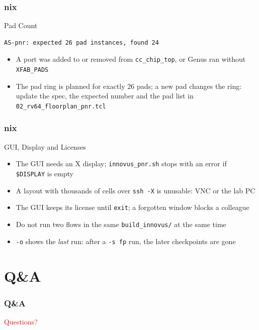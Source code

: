 \documentclass{beamer}
\newcommand{\astitle}{nix}
\newcommand{\assubtitle}{nix}
\newcommand{\cmd}[1]{\texttt{#1}}
\begin{document}
\renewcommand{\assubtitle}{Pad Count}
\begin{frame}[fragile]
\frametitle{\astitle}
\begin{block}{\assubtitle}
\begin{lstlisting}
AS-pnr: expected 26 pad instances, found 24
\end{lstlisting}
  \begin{itemize}
    \item A port was added to or removed from \cmd{cc\_chip\_top},
      or Genus ran without \cmd{XFAB\_PADS}
    \item The pad ring is planned for exactly 26 pads; a new pad changes
      the ring: update the spec, the expected number and the pad list in
      \cmd{02\_rv64\_floorplan\_pnr.tcl}
  \end{itemize}
\end{block}
\end{frame}

\renewcommand{\assubtitle}{GUI, Display and Licenses}
\begin{frame}
\frametitle{\astitle}
\begin{block}{\assubtitle}
  \begin{itemize}
    \item The GUI needs an X display; \cmd{innovus\_pnr.sh} stops with an
      error if \cmd{\$DISPLAY} is empty
    \item A layout with thousands of cells over \cmd{ssh -X} is unusable:
      VNC or the lab PC
    \item The GUI keeps its license until \cmd{exit}; a forgotten window
      blocks a colleague
    \item Do not run two flows in the same \cmd{build\_innovus/} at the same time
    \item \cmd{-o} shows the \emph{last} run: after a \cmd{-s fp} run, the
      later checkpoints are gone
  \end{itemize}
\end{block}
\end{frame}

\section{Q\&A}
\renewcommand{\astitle}{Q\&A}
\begin{frame}
\frametitle{\astitle}
\vfill
\centering
\begin{Huge}\textcolor{red}{Questions?}\end{Huge}
\vfill
\end{frame}
\end{document}

